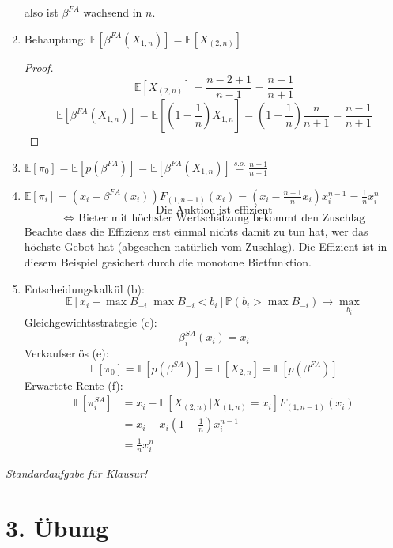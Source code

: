 \documentclass[12pt]{extreport} %
\theoremstyle{named}
\theoremstyle{nnamed}
\theoremstyle{itshape}
\theoremstyle{normal}
\begin{document}
\begin{enumerate}
		also ist $\beta^{FA}$ wachsend in $n$.
	\item Behauptung: $\mathds{E}\left[ \beta^{FA}(X_{1,n}) \right] = \mathds{E}\left[ X_{(2,n)} \right]$ 
		\begin{proof}
			 $$ \mathds{E}\left[ X_{(2,n)} \right] = \frac{n-2+1}{n-1} = \frac{n-1}{n+1} $$ 
			 $$ \mathds{E}\left[ \beta^{FA}(X_{1,n}) \right] = \mathds{E}\left[ \left( 1 - \frac{1}{n} \right) X_{1,n} \right] = \left( 1 - \frac{1}{n} \right) \frac{n}{n+1} = \frac{n-1}{n+1} $$
		\end{proof}
	\item $\mathds{E}\left[ \pi_0 \right] = \mathds{E}\left[ p \left( \beta^{FA} \right) \right] = \mathds{E}\left[ \beta^{FA} \left( X_{1,n} \right) \right] \overset{s.o.}{=} \frac{n-1}{n+1}$ 
	\item $\mathds{E}\left[ \pi_i \right] = \left( x_i - \beta^{FA}(x_i) \right) F_{(1,n-1)}(x_{i}) = \left( x_i - \frac{n-1}{n} x_i \right) x_i^{n-1} = \frac{1}{n} x_i^n$ ~\\
		$$ \text{Die Auktion ist effizient} $$ 
		$$ \iff \text{ Bieter mit höchster Wertschätzung bekommt den Zuschlag} $$
		Beachte dass die Effizienz erst einmal nichts damit zu tun hat, wer das höchste Gebot hat (abgesehen natürlich vom Zuschlag). Die Effizient ist in diesem Beispiel gesichert durch die monotone Bietfunktion.
	\item Entscheidungskalkül (b):
		$$ \mathds{E} \left[ x_i - \max B_{-i} \big| \max B_{-i} < b_{i} \right] \mathds{P} \left( b_i > \max B_{-i} \right) \longrightarrow \max_{b_i} $$
		Gleichgewichtsstrategie (c):
			$$ \beta_i^{SA}(x_i) = x_i $$
		Verkaufserlös (e):
			$$ \mathds{E}[\pi_{0}] = \mathds{E}\left[ p\left( \beta^{SA} \right) \right] = \mathds{E}[ X_{2,n} ] = \mathds{E} \left[ p\left( \beta^{FA} \right) \right] $$
		Erwartete Rente (f):
			\begin{align*}
				\mathds{E}[\pi_i^{SA}] & = x_i - \mathds{E} \left[ X_{(2,n)} \big|  X_{(1,n)} = x_i \right] F_{(1,n-1)}(x_i) \\
				& = x_i - x_i \left( 1 - \frac{1}{n} \right) x_i^{n-1} \\
				& = \frac{1}{n} x_i^n
			\end{align*}
\end{enumerate}

\textit{Standardaufgabe für Klausur!}

\newpage

\section*{3. Übung}
\end{document}
